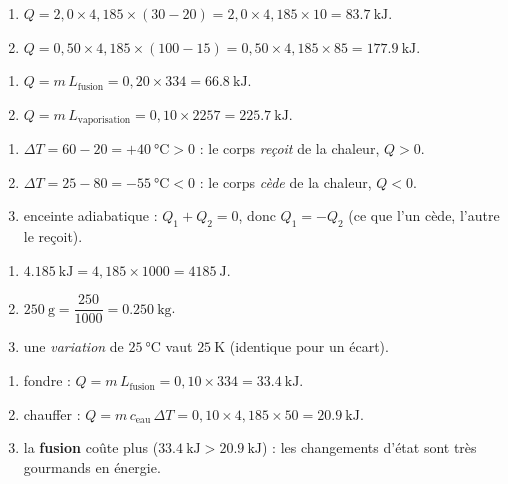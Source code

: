 \documentclass[11pt,a4paper]{article}
\begin{document}
\begin{corrige}[chaleur sensible $Q=mc\Delta T$]
\begin{enumerate}[label=\alph*)]
  \item $Q = 2{,}0\times 4{,}185\times(30-20) = 2{,}0\times 4{,}185\times 10 = \qty{83.7}{\kilo\joule}$.
  \item $Q = 0{,}50\times 4{,}185\times(100-15) = 0{,}50\times 4{,}185\times 85 = \qty{177.9}{\kilo\joule}$.
\end{enumerate}
\end{corrige}

\begin{corrige}[chaleur latente $Q=mL$]
\begin{enumerate}[label=\alph*)]
  \item $Q = m\,L_{\text{fusion}} = 0{,}20\times 334 = \qty{66.8}{\kilo\joule}$.
  \item $Q = m\,L_{\text{vaporisation}} = 0{,}10\times 2257 = \qty{225.7}{\kilo\joule}$.
\end{enumerate}
\end{corrige}

\begin{corrige}
\begin{enumerate}[label=\alph*)]
  \item $\Delta T = 60-20 = +\qty{40}{\celsius}>0$ : le corps \emph{reçoit} de la chaleur, $Q>0$.
  \item $\Delta T = 25-80 = -\qty{55}{\celsius}<0$ : le corps \emph{cède} de la chaleur, $Q<0$.
  \item enceinte adiabatique : $Q_1 + Q_2 = 0$, donc $Q_1 = -Q_2$ (ce que l'un cède, l'autre le reçoit).
\end{enumerate}
\end{corrige}

\begin{corrige}
\begin{enumerate}[label=\alph*)]
  \item $\qty{4.185}{\kilo\joule} = 4{,}185\times 1000 = \qty{4185}{\joule}$.
  \item $\qty{250}{\gram} = \dfrac{250}{1000} = \qty{0.250}{\kilogram}$.
  \item une \emph{variation} de $\qty{25}{\celsius}$ vaut $\qty{25}{\kelvin}$ (identique pour un écart).
\end{enumerate}
\end{corrige}

\begin{corrige}
\begin{enumerate}[label=\alph*)]
  \item fondre : $Q = m\,L_{\text{fusion}} = 0{,}10\times 334 = \qty{33.4}{\kilo\joule}$.
  \item chauffer : $Q = m\,c_{\text{eau}}\,\Delta T = 0{,}10\times 4{,}185\times 50 = \qty{20.9}{\kilo\joule}$.
  \item la \textbf{fusion} coûte plus ($\qty{33.4}{\kilo\joule}>\qty{20.9}{\kilo\joule}$) : les changements d'état sont très gourmands en énergie.
\end{enumerate}
\end{corrige}
\end{document}
